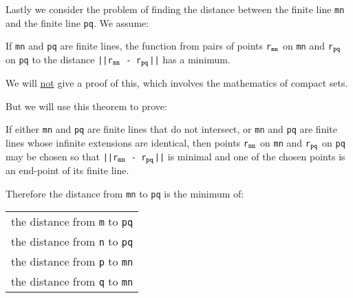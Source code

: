\documentclass[12pt]{article}
\begin{document}
Lastly we consider the problem of finding the distance between
the finite line {\tt mn} and the finite line {\tt pq}.  We assume:

\begin{theorem}
If {\tt mn} and {\tt pq} are finite lines, the function from pairs
of points
{\tt r$_{\tt mn}$} on {\tt mn} and
{\tt r$_{\tt pq}$} on {\tt pq}  to the distance
{\tt ||r$_{\tt mn}$ - r$_{\tt pq}$||} has a minimum.
\end{theorem}

We will \underline{not} give a proof of this,
which involves the mathematics of compact sets.

But we will use this theorem to prove:

\begin{theorem}
\label{FINITE-LINE-DISTANCE-THEOREM}
If either {\tt mn} and {\tt pq} are finite lines that do not intersect, or
{\tt mn} and {\tt pq} are finite lines whose infinite extensions are
identical, then
points {\tt r$_{\tt mn}$} on {\tt mn} and
{\tt r$_{\tt pq}$} on {\tt pq} may be chosen so that
{\tt ||r$_{\tt mn}$ - r$_{\tt pq}$||} is minimal and
one of the chosen points is an end-point of its finite line.

Therefore the distance from {\tt mn} to {\tt pq} is the
minimum of: \\
\hspace*{0.5in}\begin{tabular}{l}
the distance from {\tt m} to {\tt pq} \\
the distance from {\tt n} to {\tt pq} \\
the distance from {\tt p} to {\tt mn} \\
the distance from {\tt q} to {\tt mn} \\
\end{tabular}
\end{theorem}
\end{document}
